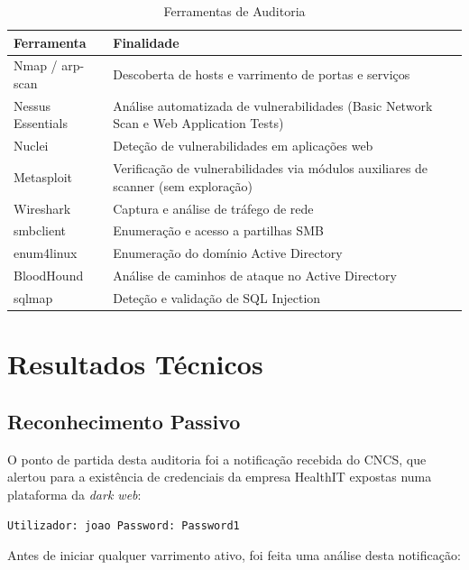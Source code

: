\documentclass[12pt, a4paper]{report}
\newcommand{\thead}[1]{\bfseries\small\color{white}#1}
\begin{document}
\begin{table}[H]
\centering
\caption{Ferramentas de Auditoria}
\begin{tabularx}{\linewidth}{l X}
\toprule
\rowcolor{TableHead}
\thead{Ferramenta} & \thead{Finalidade} \\
\midrule
Nmap / arp-scan   & Descoberta de hosts e varrimento de portas e serviços \\
\rowcolor{TableAlt}
Nessus Essentials & Análise automatizada de vulnerabilidades (Basic Network Scan e Web Application Tests) \\
Nuclei            & Deteção de vulnerabilidades em aplicações web \\
\rowcolor{TableAlt}
Metasploit        & Verificação de vulnerabilidades via módulos auxiliares de scanner (sem exploração) \\
Wireshark         & Captura e análise de tráfego de rede \\
\rowcolor{TableAlt}
smbclient         & Enumeração e acesso a partilhas SMB \\
enum4linux        & Enumeração do domínio Active Directory \\
\rowcolor{TableAlt}
BloodHound        & Análise de caminhos de ataque no Active Directory \\
sqlmap            & Deteção e validação de SQL Injection \\
\bottomrule
\end{tabularx}
\end{table}

\chapter{Resultados Técnicos}

\section{Reconhecimento Passivo}

O ponto de partida desta auditoria foi a notificação recebida do CNCS, que alertou para a
existência de credenciais da empresa HealthIT expostas numa plataforma da \textit{dark web}:

\begin{center}
\texttt{Utilizador: joao \quad Password: Password1}
\end{center}

Antes de iniciar qualquer varrimento ativo, foi feita uma análise desta notificação:
\end{document}
